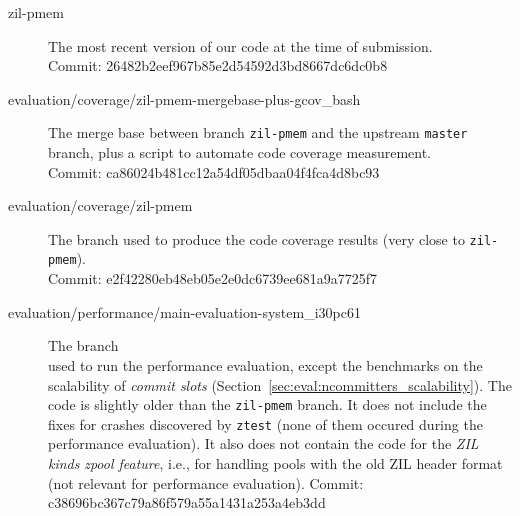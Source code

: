 \documentclass[12pt,a4paper,twoside]{book}
\begin{document}
\begin{description}
    \item[zil-pmem]                                                                         The most recent version of our code at the time of submission.\\
                                                                                            {Commit: \footnotesize 26482b2eef967b85e2d54592d3bd8667dc6dc0b8}

    \item[evaluation/coverage/zil-pmem-mergebase-plus-gcov\_bash]                           The merge base between branch \lstinline{zil-pmem} and the upstream \lstinline{master} branch, plus a script to automate code coverage measurement.\\
                                                                                                {Commit: \footnotesize ca86024b481cc12a54df05dbaa04f4fca4d8bc93}

    \item[evaluation/coverage/zil-pmem]                                                     The branch used to produce the code coverage results (very close to \lstinline{zil-pmem}).\\
                                                                                            {Commit: \footnotesize e2f42280eb48eb05e2e0dc6739ee681a9a7725f7}

    \item[evaluation/performance/main-evaluation-system\_i30pc61]                           The branch \\ used to run the performance evaluation, except the benchmarks on the scalability of \textit{commit slots} (Section~\ref{sec:eval:ncommitters_scalability}).
                                                                                            The code is slightly older than the \lstinline{zil-pmem} branch.
                                                                                            It does not include the fixes for crashes discovered by \lstinline{ztest} (none of them occured during the performance evaluation).
                                                                                            It also does not contain the code for the \textit{ZIL kinds} \textit{zpool feature}, i.e., for handling pools with the old ZIL header format (not relevant for performance evaluation).
                                                                                            {Commit: \footnotesize c38696bc367c79a86f579a55a1431a253a4eb3dd}


\end{description}
\end{document}

